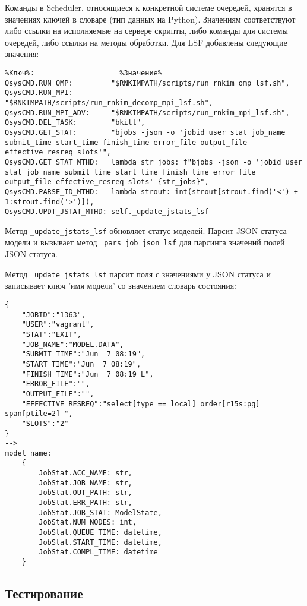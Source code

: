 Команды в Scheduler, относящиеся к конкретной системе очередей, хранятся в значениях ключей в словаре (тип данных на Python). Значениям соответствуют либо ссылки на исполняемые на сервере скрипты, либо команды для системы очередей, либо ссылки на методы обработки. Для LSF добавлены следующие значения:
\begin{lstlisting}
%Ключ%:                    %Значение%
QsysCMD.RUN_OMP:         "$RNKIMPATH/scripts/run_rnkim_omp_lsf.sh",
QsysCMD.RUN_MPI:         "$RNKIMPATH/scripts/run_rnkim_decomp_mpi_lsf.sh",
QsysCMD.RUN_MPI_ADV:     "$RNKIMPATH/scripts/run_rnkim_mpi_lsf.sh",
QsysCMD.DEL_TASK:        "bkill",
QsysCMD.GET_STAT:        "bjobs -json -o 'jobid user stat job_name submit_time start_time finish_time error_file output_file effective_resreq slots'",
QsysCMD.GET_STAT_MTHD:   lambda str_jobs: f"bjobs -json -o 'jobid user stat job_name submit_time start_time finish_time error_file output_file effective_resreq slots' {str_jobs}",
QsysCMD.PARSE_ID_MTHD:   lambda strout: int(strout[strout.find('<') + 1:strout.find('>')]),
QsysCMD.UPDT_JSTAT_MTHD: self._update_jstats_lsf
\end{lstlisting}

Метод \lstinline{_update_jstats_lsf} обновляет статус моделей. Парсит JSON статуса модели и вызывает метод \lstinline{_pars_job_json_lsf} для парсинга значений полей JSON статуса.

Метод \lstinline{_update_jstats_lsf} парсит поля с значениями у JSON статуса и записывает ключ 'имя модели' со значением словарь состояния:
\begin{lstlisting}
{
    "JOBID":"1363",
    "USER":"vagrant",
    "STAT":"EXIT",
    "JOB_NAME":"MODEL.DATA",
    "SUBMIT_TIME":"Jun  7 08:19",
    "START_TIME":"Jun  7 08:19",
    "FINISH_TIME":"Jun  7 08:19 L",
    "ERROR_FILE":"",
    "OUTPUT_FILE":"",
    "EFFECTIVE_RESREQ":"select[type == local] order[r15s:pg] span[ptile=2] ",
    "SLOTS":"2"
}
-->
model_name:
    {
        JobStat.ACC_NAME: str,
        JobStat.JOB_NAME: str,
        JobStat.OUT_PATH: str,
        JobStat.ERR_PATH: str,
        JobStat.JOB_STAT: ModelState,
        JobStat.NUM_NODES: int,
        JobStat.QUEUE_TIME: datetime,
        JobStat.START_TIME: datetime,
        JobStat.COMPL_TIME: datetime
    }
\end{lstlisting}


\subsection{Тестирование}

